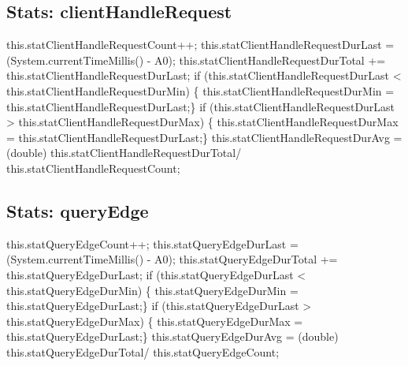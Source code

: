 \subsection{Stats: clientHandleRequest}
\nwenddocs{}\endmoddef{}
    this.statClientHandleRequestCount++;
    this.statClientHandleRequestDurLast = (System.currentTimeMillis() - A0);
    this.statClientHandleRequestDurTotal +=
    this.statClientHandleRequestDurLast;
if (this.statClientHandleRequestDurLast <
    this.statClientHandleRequestDurMin) \{
    this.statClientHandleRequestDurMin =
    this.statClientHandleRequestDurLast;\}
if (this.statClientHandleRequestDurLast >
    this.statClientHandleRequestDurMax) \{
    this.statClientHandleRequestDurMax =
    this.statClientHandleRequestDurLast;\}
    this.statClientHandleRequestDurAvg = (double)
    this.statClientHandleRequestDurTotal/
    this.statClientHandleRequestCount;
\nwendcode{}\nwdocspar

\subsection{Stats: queryEdge}
\nwenddocs{}\endmoddef{}
    this.statQueryEdgeCount++;
    this.statQueryEdgeDurLast = (System.currentTimeMillis() - A0);
    this.statQueryEdgeDurTotal +=
    this.statQueryEdgeDurLast;
if (this.statQueryEdgeDurLast <
    this.statQueryEdgeDurMin) \{
    this.statQueryEdgeDurMin =
    this.statQueryEdgeDurLast;\}
if (this.statQueryEdgeDurLast >
    this.statQueryEdgeDurMax) \{
    this.statQueryEdgeDurMax =
    this.statQueryEdgeDurLast;\}
    this.statQueryEdgeDurAvg = (double)
    this.statQueryEdgeDurTotal/
    this.statQueryEdgeCount;
\nwendcode{}\nwdocspar

